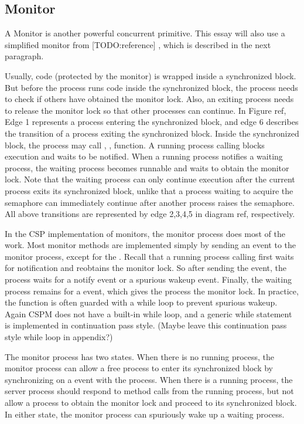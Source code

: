 \documentclass{article}
\begin{document}
\subsection{Monitor}

A Monitor is another powerful concurrent primitive. This essay will also use a simplified monitor from [TODO:reference] , which is described in the next paragraph.


Usually, code (protected by the monitor) is wrapped inside a synchronized block. But before the process runs code inside the synchronized block, the process needs to check if others have obtained the monitor lock. Also, an exiting process needs to release the monitor lock so that other processes can continue. In Figure ref, Edge 1 represents a process entering the synchronized block, and edge 6 describes the transition of a process exiting the synchronized block. Inside the synchronized block, the process may call , ,  function. A running process calling  blocks execution and waits to be notified. When a running process notifies a waiting process, the waiting process becomes runnable and waits to obtain the monitor lock. Note that the waiting process can only continue execution after the current process exits its synchronized block, unlike that a process waiting to acquire the semaphore can immediately continue after another process raises the semaphore. All above transitions are represented by edge 2,3,4,5 in diagram ref, respectively. 

In the CSP implementation of monitors, the monitor process does most of the work. Most monitor methods are implemented simply by sending an event to the monitor process, except for the . Recall that a running process calling  first waits for notification and reobtains the monitor lock. So after sending the  event, the process waits for a notify event or a spurious wakeup event. Finally, the waiting process remains for a  event, which gives the process the monitor lock. In practice, the  function is often guarded with a while loop to prevent spurious wakeup. Again CSPM does not have a built-in while loop, and a generic while statement is implemented in continuation pass style. (Maybe leave this continuation pass style while loop in appendix?)

The monitor process has two states. When there is no running process, the monitor process can allow a free process to enter its synchronized block by synchronizing on a  event with the process. When there is a running process, the server process should respond to method calls from the running process, but not allow a process to obtain the monitor lock and proceed to its synchronized block. In either state, the monitor process can spuriously wake up a waiting process.
\end{document}
